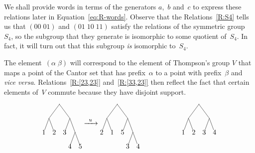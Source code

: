 \documentclass[a4paper,11pt]{article}
\numberwithin{equation}{section}
\newcommand{\swap}[2]{(#1\;#2)}
\begin{document}
We shall provide words in terms of the generators $a$,~$b$ and~$c$ to
express these relations later in Equation~\eqref{eq:R-words}.
Observe that the
Relations~\ref{R:S4} tells us that $\swap{00}{01}$ and $(01 \;
10 \; 11)$ satisfy the relations of the symmetric group~$S_{4}$, so
the subgroup that they generate is isomorphic to some quotient
of~$S_{4}$.  In fact, it will turn out that this subgroup \emph{is}
isomorphic to~$S_{4}$.

The element~$\swap{\alpha}{\beta}$ will correspond to the element of
Thompson's group $V$ that maps a point of the Cantor set that has
prefix~$\alpha$ to a point with prefix~$\beta$ and \emph{vice versa}.
Relations~\ref{R:[23,23]} and~\ref{R:[33,23]}
then reflect the fact that certain elements of~$V$ commute because
they have disjoint support.

\begin{figure}[b]
  \[
  \begin{tikzpicture}[
      inner sep=0pt,
      baseline=-30pt,
      level distance=20pt,
      level 1/.style={sibling distance=30pt},
      level 2/.style={sibling distance=15pt}
    ]
    \node (root) [circle,fill] {}
    child {node (0) [circle,fill] {}
      child {node (00) {$1$}}
      child {node (01) {$2$}}}
    child {node (1) [circle,fill] {}
      child {node (10) {$3$}}
      child {node (11) [circle,fill] {}
        child {node (110) {$4$}}
        child {node (111) {$5$}}}};
  \end{tikzpicture}
  \xrightarrow{\;\;u\;\;}
  \begin{tikzpicture}[
      inner sep=0pt,
      baseline=-30pt,
      level distance=20pt,
      level 1/.style={sibling distance=30pt},
      level 2/.style={sibling distance=15pt}
    ]
    \node (root) [circle,fill] {}
    child {node (0) [circle,fill] {}
      child {node (00) {$2$}}
      child {node (01) {$1$}}}
    child {node (1) [circle,fill] {}
      child {node (10) {$5$}}
      child {node (11) [circle,fill] {}
        child {node (110) {$3$}}
        child {node (111) {$4$}}}};
  \end{tikzpicture}
  \qquad\qquad\qquad
  \begin{tikzpicture}[
      inner sep=0pt,
      baseline=-30pt,
      level distance=20pt,
      level 1/.style={sibling distance=30pt},
      level 2/.style={sibling distance=15pt}
    ]
    \node (root) [circle,fill] {}
    child {node (0) [circle,fill] {}
      child {node (00) {$1$}}
      child {node (01) {$2$}}}
    child {node (1) [circle,fill] {}
      child {node (10) {$3$}}
      child {node (11) {$4$}}};

\end{tikzpicture}\]
\end{figure}
\end{document}
